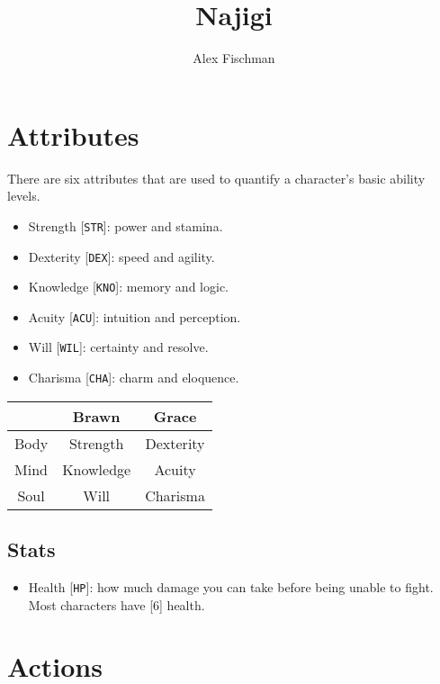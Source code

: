 \documentclass[12pt]{article}
\title{Najigi}
\author{Alex Fischman}
\newcommand{\STR}{\texttt{STR}}
\newcommand{\DEX}{\texttt{DEX}}
\newcommand{\KNO}{\texttt{KNO}}
\newcommand{\ACU}{\texttt{ACU}}
\newcommand{\WIL}{\texttt{WIL}}
\newcommand{\CHA}{\texttt{CHA}}
\newcommand{\HP}{\texttt{HP}}
\begin{document}
\maketitle
\tableofcontents
\clearpage

\pagebreak
\section{Attributes}

There are six attributes that are used to quantify a character's basic ability levels.

\begin{multicols}{2}

\begin{itemize}
\item Strength [\STR]: power and stamina.
\item Dexterity [\DEX]: speed and agility.
\item Knowledge [\KNO]: memory and logic.
\item Acuity [\ACU]: intuition and perception.
\item Will [\WIL]: certainty and resolve.
\item Charisma [\CHA]: charm and eloquence.
\end{itemize}

\columnbreak

\begin{tabularx}{\linewidth}{C|C C}
& Brawn & Grace \\\hline
Body & Strength & Dexterity \\
Mind & Knowledge & Acuity \\
Soul & Will & Charisma
\end{tabularx}

\end{multicols}

\subsection{Stats}

\begin{itemize}
\item Health [\HP]: how much damage you can take before being unable to fight. Most characters have [6] health.
\end{itemize}

\pagebreak
\section{Actions}
\end{document}
